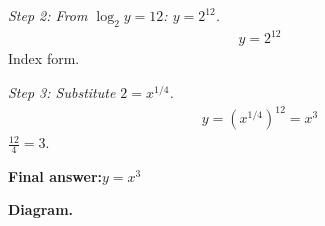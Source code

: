 \documentclass[11pt]{article}
\begin{document}
\textit{Step 2: From \( \log_2 y = 12 \): \( y = 2^{12} \).}
\[\begin{gathered}
y = 2^{12}
\end{gathered}\]
Index form.

\textit{Step 3: Substitute \( 2 = x^{1/4} \).}
\[\begin{gathered}
y = \left(x^{1/4}\right)^{12} = x^{3}
\end{gathered}\]
\( \frac{12}{4} = 3 \).

\begin{answerbox}
\textbf{Final answer:}\quad \(\displaystyle  y = x^3 \)
\end{answerbox}
\textbf{Diagram.}

\begin{center}
\end{center}
\end{document}
